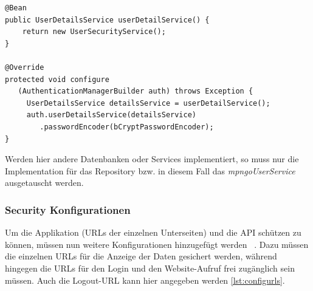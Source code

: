 \lstset{
  caption=[Konfiguration für das Spring Security UserService]{Konfiguration für das Spring Security UserService. Das Service \textit{UserSecurityService} wird nun als das zentrale Service für die Useroperationen von Spring Security verwendet.}, 
  basicstyle=\small\ttfamily, 
  label=lst:config, 
  language=Java,
  frame=single,
  breaklines=true, %
  postbreak=\mbox{\textcolor{red}{$\hookrightarrow$}\space},
}

\begin{samepage}%
	\begin{lstlisting}[float=tbhp]
@Bean
public UserDetailsService userDetailService() {
    return new UserSecurityService();
}

@Override
protected void configure
   (AuthenticationManagerBuilder auth) throws Exception {
     UserDetailsService detailsService = userDetailService();
     auth.userDetailsService(detailsService)
        .passwordEncoder(bCryptPasswordEncoder);
}
	\end{lstlisting}
\end{samepage}
Werden hier andere Datenbanken oder Services implementiert, so muss nur die Implementation für das Repository bzw. in diesem Fall das \textit{mpngoUserService} ausgetauscht werden. 
\subsubsection{Security Konfigurationen}
Um die Applikation (URLs der einzelnen Unterseiten) und die API schützen zu können, müssen nun weitere Konfigurationen hinzugefügt werden ~\parencite{springSecBook}. Dazu müssen die einzelnen URLs für die Anzeige der Daten gesichert werden, während hingegen die URLs für den Login und den Website-Aufruf frei zugänglich sein müssen. Auch die Logout-URL kann hier angegeben werden \ref{lst:configurls}.
\lstset{
  caption=[Konfiguration für die Sicherheit der URLs.]{Konfiguration für die Sicherheit der URLs. Die einzelnen Paths können entweder für alle freigegeben oder für eine bestimmte Gruppe angezeigt werden. Das Abmelden wird von Spring automatisch durchgeführt.}, 
  basicstyle=\small\ttfamily, 
  label=lst:configurls, 
  language=Java,
  frame=single,
  breaklines=true, %
  postbreak=\mbox{\textcolor{red}{$\hookrightarrow$}\space},
}

